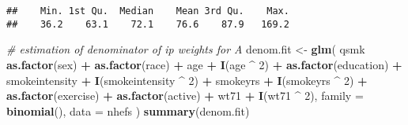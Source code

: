 \documentclass[10pt,]{book}
\newenvironment{Shaded}{\begin{snugshade}}{\end{snugshade}}
\newcommand{\CommentTok}[1]{\textcolor[rgb]{0.56,0.35,0.01}{\textit{#1}}}
\newcommand{\DataTypeTok}[1]{\textcolor[rgb]{0.13,0.29,0.53}{#1}}
\newcommand{\DecValTok}[1]{\textcolor[rgb]{0.00,0.00,0.81}{#1}}
\newcommand{\KeywordTok}[1]{\textcolor[rgb]{0.13,0.29,0.53}{\textbf{#1}}}
\newcommand{\NormalTok}[1]{#1}
\newcommand{\OperatorTok}[1]{\textcolor[rgb]{0.81,0.36,0.00}{\textbf{#1}}}
\newcommand{\StringTok}[1]{\textcolor[rgb]{0.31,0.60,0.02}{#1}}
\begin{document}
\begin{verbatim}
##    Min. 1st Qu.  Median    Mean 3rd Qu.    Max. 
##    36.2    63.1    72.1    76.6    87.9   169.2
\end{verbatim}

\begin{Shaded}
\begin{Highlighting}[]
\CommentTok{# estimation of denominator of ip weights for A}
\NormalTok{denom.fit <-}
\StringTok{  }\KeywordTok{glm}\NormalTok{(}
\NormalTok{    qsmk }\OperatorTok{~}\StringTok{ }\KeywordTok{as.factor}\NormalTok{(sex) }\OperatorTok{+}\StringTok{ }\KeywordTok{as.factor}\NormalTok{(race) }\OperatorTok{+}\StringTok{ }\NormalTok{age }\OperatorTok{+}\StringTok{ }\KeywordTok{I}\NormalTok{(age }\OperatorTok{^}\StringTok{ }\DecValTok{2}\NormalTok{) }\OperatorTok{+}
\StringTok{      }\KeywordTok{as.factor}\NormalTok{(education) }\OperatorTok{+}\StringTok{ }\NormalTok{smokeintensity }\OperatorTok{+}
\StringTok{      }\KeywordTok{I}\NormalTok{(smokeintensity }\OperatorTok{^}\StringTok{ }\DecValTok{2}\NormalTok{) }\OperatorTok{+}\StringTok{ }\NormalTok{smokeyrs }\OperatorTok{+}\StringTok{ }\KeywordTok{I}\NormalTok{(smokeyrs }\OperatorTok{^}\StringTok{ }\DecValTok{2}\NormalTok{) }\OperatorTok{+}
\StringTok{      }\KeywordTok{as.factor}\NormalTok{(exercise) }\OperatorTok{+}\StringTok{ }\KeywordTok{as.factor}\NormalTok{(active) }\OperatorTok{+}\StringTok{ }\NormalTok{wt71 }\OperatorTok{+}\StringTok{ }\KeywordTok{I}\NormalTok{(wt71 }\OperatorTok{^}\StringTok{ }\DecValTok{2}\NormalTok{),}
    \DataTypeTok{family =} \KeywordTok{binomial}\NormalTok{(),}
    \DataTypeTok{data =}\NormalTok{ nhefs}
\NormalTok{  )}
\KeywordTok{summary}\NormalTok{(denom.fit)}
\end{Highlighting}
\end{Shaded}
\end{document}
